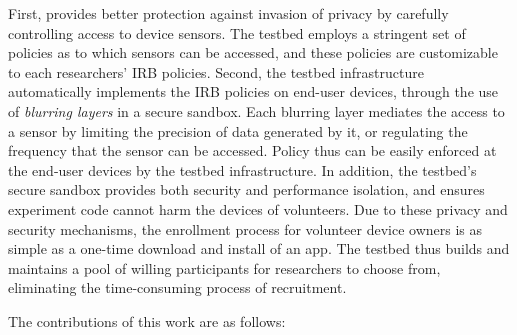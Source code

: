 First, \sysname provides better protection against invasion of privacy by carefully controlling
access to device sensors. The testbed employs a stringent set of
policies as to which sensors can be accessed, and these
policies are customizable to each researchers' IRB policies. 
Second, the testbed infrastructure automatically implements
the IRB policies on end-user devices, through the use of \textit{blurring 
layers} in a secure sandbox. Each blurring layer mediates the access to 
a sensor by limiting the precision of data generated by it, or 
regulating the frequency that the sensor can be accessed. Policy thus
can be easily enforced at the end-user devices by the testbed 
infrastructure. In addition, 
the testbed's secure sandbox provides both security and performance 
isolation, and ensures experiment code cannot harm the devices of 
volunteers. Due to these privacy and security mechanisms, 
the enrollment process for volunteer device owners is as
simple as a one-time download and install of an app. The testbed thus
builds and maintains a pool of willing participants for researchers to
choose from, eliminating the time-consuming process of recruitment.


The contributions of this work are as follows:

